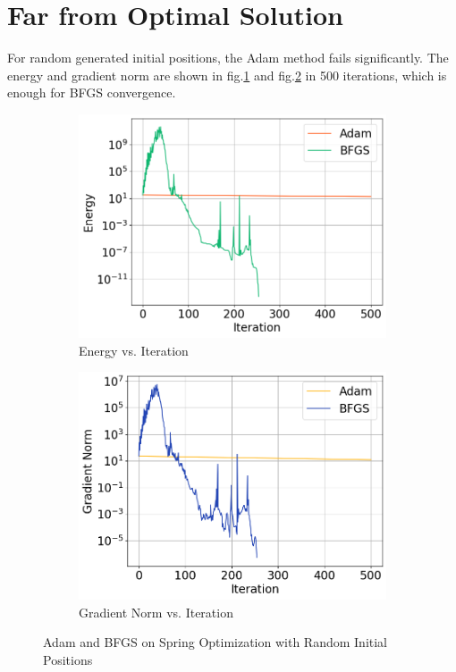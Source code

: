 \documentclass[12pt]{article}
\newcommand{\0}{\boldsymbol{0}}
\begin{document}
\section{Far from Optimal Solution}

For random generated initial positions, the Adam method fails significantly. The energy and gradient norm are shown in fig.\ref{fig:energy_random} and fig.\ref{fig:gradient_norm_random} in 500 iterations, which is enough for BFGS convergence. 
\begin{figure}[h!]
    \centering
    \begin{subfigure}[b]{0.45\textwidth}
        \centering
        \includegraphics[width=\textwidth]{../img/problem_2/energy_random.png}
        \caption{Energy vs. Iteration}
        \label{fig:energy_random}
        
    \end{subfigure}
    \hfill
    \begin{subfigure}[b]{0.45\textwidth}
        \centering
        \includegraphics[width=\textwidth]{../img/problem_2/gradient_norm_random.png}
        \caption{Gradient Norm vs. Iteration}
        \label{fig:gradient_norm_random}
    \end{subfigure}
    \label{fig:adam_vs_bfgs_random}
    \caption{Adam and BFGS on Spring Optimization with Random Initial Positions}
\end{figure}
\end{document}
